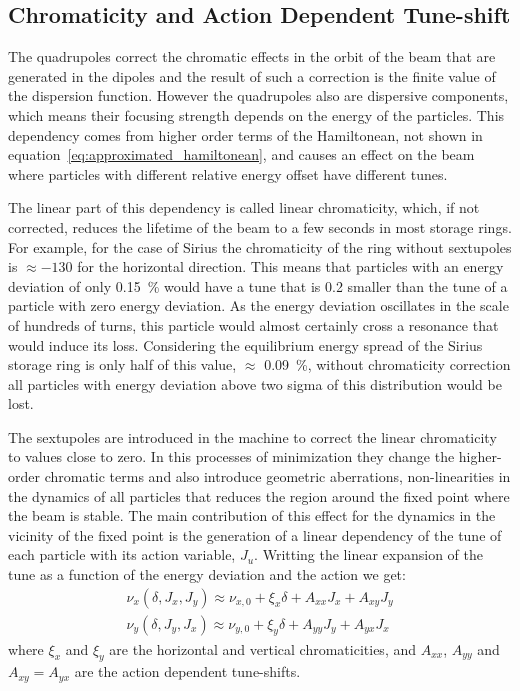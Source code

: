 \subsection{Chromaticity and Action Dependent Tune-shift}

	The quadrupoles correct the chromatic effects in the orbit of the beam that are generated in the dipoles and the result of such a correction is the finite value of the dispersion function. However the quadrupoles also are dispersive components, which means their focusing strength depends on the energy of the particles. This dependency comes from higher order terms of the Hamiltonean, not shown in equation~\eqref{eq:approximated_hamiltonean}, and causes an effect on the beam where particles with different relative energy offset have different tunes.

    The linear part of this dependency is called linear chromaticity, which, if not corrected, reduces the lifetime of the beam to a few seconds in most storage rings. For example, for the case of Sirius the chromaticity of the ring without sextupoles is $\approx -130$ for the horizontal direction. This means that particles with an energy deviation of only \SI{0.15}{\percent} would have a tune that is \SI{0.2}{} smaller than the tune of a particle with zero energy deviation. As the energy deviation oscillates in the scale of hundreds of turns, this particle would almost certainly cross a resonance that would induce its loss. Considering the equilibrium energy spread of the Sirius storage ring is only half of this value, $\approx$ \SI{0.09}{\percent}, without chromaticity correction all particles with energy deviation above two sigma of this distribution would be lost.

	The sextupoles are introduced in the machine to correct the linear chromaticity to values close to zero. In this processes of minimization they change the higher-order chromatic terms and also introduce geometric aberrations, non-linearities in the dynamics of all particles that reduces the region around the fixed point where the beam is stable. The main contribution of this effect for the dynamics in the vicinity of the fixed point is the generation of a linear dependency of the tune of each particle with its action variable, $J_u$. Writting the linear expansion of the tune as a function of the energy deviation and the action we get:
	\begin{align}
		\nu_x(\delta, J_x, J_y) \approx \nu_{x,0} + \xi_x \delta + A_{xx} J_x + A_{xy} J_y \\\nonumber
		\nu_y(\delta, J_y, J_x) \approx \nu_{y,0} + \xi_y \delta + A_{yy} J_y + A_{yx} J_x
	\end{align}
	where $\xi_x$ and $\xi_y$ are the horizontal and vertical chromaticities, and $A_{xx}$, $A_{yy}$ and $A_{xy}=A_{yx}$ are the action dependent tune-shifts.


